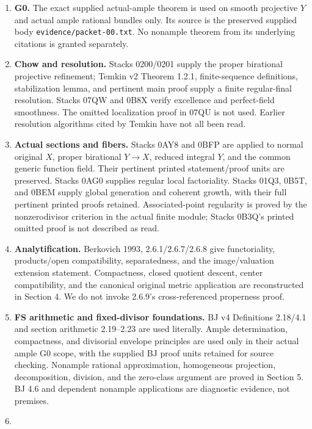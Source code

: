 \documentclass[
  10pt,
]{article}
\providecommand{\tightlist}{%
  \setlength{\itemsep}{0pt}\setlength{\parskip}{0pt}}
\begin{document}
\begin{enumerate}
\def\labelenumi{\arabic{enumi}.}
\tightlist
\item
  \textbf{G0.} The exact supplied actual-ample theorem is used on smooth
  projective \(Y\) and actual ample rational bundles only. Its source is
  the preserved supplied body \texttt{evidence/packet-00.txt}. No
  nonample theorem from its underlying citations is granted separately.
\item
  \textbf{Chow and resolution.} Stacks 0200/0201 supply the proper
  birational projective refinement; Temkin v2 Theorem 1.2.1,
  finite-sequence definitions, stabilization lemma, and pertinent main
  proof supply a finite regular-final resolution. Stacks 07QW and 0B8X
  verify excellence and perfect-field smoothness. The omitted
  localization proof in 07QU is not used. Earlier resolution algorithms
  cited by Temkin have not all been read.
\item
  \textbf{Actual sections and fibers.} Stacks 0AY8 and 0BFP are applied
  to normal original \(X\), proper birational \(Y\to X\), reduced
  integral \(Y\), and the common generic function field. Their pertinent
  printed statement/proof units are preserved. Stacks 0AG0 supplies
  regular local factoriality. Stacks 01Q3, 0B5T, and 0BEM supply global
  generation and coherent growth, with their full pertinent printed
  proofs retained. Associated-point regularity is proved by the
  nonzerodivisor criterion in the actual finite module; Stacks 0B3Q's
  printed omitted proof is not described as read.
\item
  \textbf{Analytification.} Berkovich 1993, 2.6.1/2.6.7/2.6.8 give
  functoriality, products/open compatibility, separatedness, and the
  image/valuation extension statement. Compactness, closed quotient
  descent, center compatibility, and the canonical original metric
  application are reconstructed in Section 4. We do not invoke 2.6.9's
  cross-referenced properness proof.
\item
  \textbf{FS arithmetic and fixed-divisor foundations.} BJ v4
  Definitions 2.18/4.1 and section arithmetic 2.19--2.23 are used
  literally. Ample determination, compactness, and divisorial envelope
  principles are used only in their actual ample G0 scope, with the
  supplied BJ proof units retained for source checking. Nonample
  rational approximation, homogeneous projection, decomposition,
  division, and the zero-class argument are proved in Section 5. BJ 4.6
  and dependent nonample applications are diagnostic evidence, not
  premises.
\item

\end{enumerate}
\end{document}
